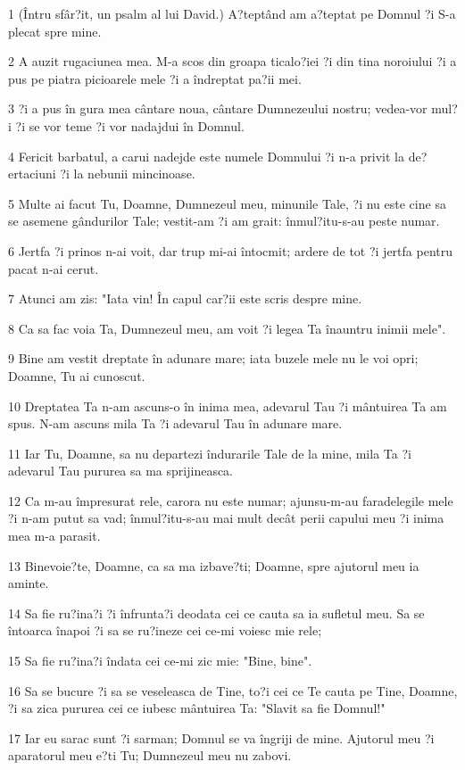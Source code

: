 \par 1 (Întru sfâr?it, un psalm al lui David.) A?teptând am a?teptat pe Domnul ?i S-a plecat spre mine.
\par 2 A auzit rugaciunea mea. M-a scos din groapa ticalo?iei ?i din tina noroiului ?i a pus pe piatra picioarele mele ?i a îndreptat pa?ii mei.
\par 3 ?i a pus în gura mea cântare noua, cântare Dumnezeului nostru; vedea-vor mul?i ?i se vor teme ?i vor nadajdui în Domnul.
\par 4 Fericit barbatul, a carui nadejde este numele Domnului ?i n-a privit la de?ertaciuni ?i la nebunii mincinoase.
\par 5 Multe ai facut Tu, Doamne, Dumnezeul meu, minunile Tale, ?i nu este cine sa se asemene gândurilor Tale; vestit-am ?i am grait: înmul?itu-s-au peste numar.
\par 6 Jertfa ?i prinos n-ai voit, dar trup mi-ai întocmit; ardere de tot ?i jertfa pentru pacat n-ai cerut.
\par 7 Atunci am zis: "Iata vin! În capul car?ii este scris despre mine.
\par 8 Ca sa fac voia Ta, Dumnezeul meu, am voit ?i legea Ta înauntru inimii mele".
\par 9 Bine am vestit dreptate în adunare mare; iata buzele mele nu le voi opri; Doamne, Tu ai cunoscut.
\par 10 Dreptatea Ta n-am ascuns-o în inima mea, adevarul Tau ?i mântuirea Ta am spus. N-am ascuns mila Ta ?i adevarul Tau în adunare mare.
\par 11 Iar Tu, Doamne, sa nu departezi îndurarile Tale de la mine, mila Ta ?i adevarul Tau pururea sa ma sprijineasca.
\par 12 Ca m-au împresurat rele, carora nu este numar; ajunsu-m-au faradelegile mele ?i n-am putut sa vad; înmul?itu-s-au mai mult decât perii capului meu ?i inima mea m-a parasit.
\par 13 Binevoie?te, Doamne, ca sa ma izbave?ti; Doamne, spre ajutorul meu ia aminte.
\par 14 Sa fie ru?ina?i ?i înfrunta?i deodata cei ce cauta sa ia sufletul meu. Sa se întoarca înapoi ?i sa se ru?ineze cei ce-mi voiesc mie rele;
\par 15 Sa fie ru?ina?i îndata cei ce-mi zic mie: "Bine, bine".
\par 16 Sa se bucure ?i sa se veseleasca de Tine, to?i cei ce Te cauta pe Tine, Doamne, ?i sa zica pururea cei ce iubesc mântuirea Ta: "Slavit sa fie Domnul!"
\par 17 Iar eu sarac sunt ?i sarman; Domnul se va îngriji de mine. Ajutorul meu ?i aparatorul meu e?ti Tu; Dumnezeul meu nu zabovi.


